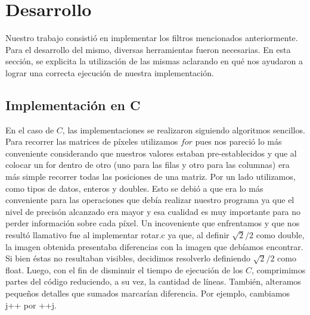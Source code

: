 \documentclass[10pt, a4paper]{article}
\begin{document}
\section{Desarrollo}
Nuestro trabajo consistió en implementar los filtros mencionados anteriormente. Para el desarrollo del mismo, diversas herramientas fueron necesarias. En esta sección, se explicita la utilización de las mismas aclarando en qué nos ayudaron a lograr una correcta ejecución de nuestra implementación.  
\subsection{Implementación en C}
En el caso de $C$, las implementaciones se realizaron siguiendo algoritmos sencillos. Para recorrer las matrices de píxeles utilizamos $for$ pues nos pareció lo más conveniente considerando que nuestros valores estaban pre-establecidos y que al colocar un for dentro de otro (uno para las filas y otro para las columnas) era más simple recorrer todas las posiciones de una matriz.
\newline
Por un lado utilizamos, como tipos de datos, enteros y doubles. Esto se debió a que era lo más conveniente para las operaciones que debía realizar nuestro programa ya que el nivel de precisón alcanzado era mayor y esa cualidad es muy importante para no perder información sobre cada píxel. Un incoveniente que enfrentamos y que nos resultó llamativo fue al implementar rotar.c ya que, al definir $\sqrt{2}/2$ como double, la imagen obtenida presentaba diferencias con la imagen que debíamos encontrar. Si bien éstas no resultaban visibles, decidimos resolverlo definiendo $\sqrt{2}/2$ como float.\newline
\newline
Luego, con el fin de disminuir el tiempo de ejecución de los $C$, comprimimos partes del código reduciendo, a su vez, la cantidad de líneas. También, alteramos pequeños detalles que sumados marcarían diferencia. Por ejemplo, cambiamos j++ por ++j.
\end{document}
